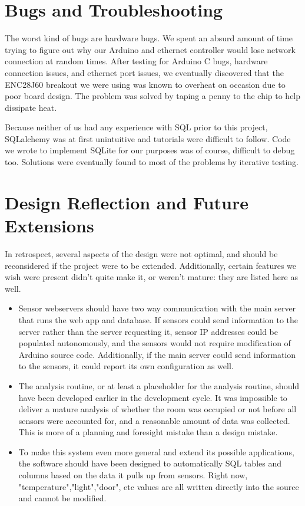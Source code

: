 \documentclass{article}
\begin{document}
\section*{Bugs and Troubleshooting}
\par The worst kind of bugs are hardware bugs. We spent an absurd amount of time trying to figure out why our Arduino and ethernet controller would lose network connection at random times. After testing for Arduino C bugs, hardware connection issues, and ethernet port issues, we eventually discovered that the ENC28J60 breakout we were using was known to overheat on occasion due to poor board design. The problem was solved by taping a penny to the chip to help dissipate heat. 

\par Because neither of us had any experience with SQL prior to this project, SQLalchemy was at first unintuitive and tutorials were difficult to follow. Code we wrote to implement SQLite for our purposes was of course, difficult to debug too. Solutions were eventually found to most of the problems by iterative testing.

\section*{Design Reflection and Future Extensions}
\par In retrospect, several aspects of the design were not optimal, and should be reconsidered if the project were to be extended.  Additionally, certain features we wish were present didn't quite make it, or weren't mature: they are listed here as well.
\begin{itemize}
    \item Sensor webservers should have two way communication with the main server that runs the web app and database. If sensors could send information to the server rather than the server requesting it, sensor IP addresses could be populated autonomously, and the sensors would not require modification of Arduino source code. Additionally, if the main server could send information to the sensors, it could report its own configuration as well.
    \item The analysis routine, or at least a placeholder for the analysis routine, should have been developed earlier in the development cycle. It was impossible to deliver a mature analysis of whether the room was occupied or not before all sensors were accounted for, and a reasonable amount of data was collected. This is more of a planning and foresight mistake than a design mistake.
    \item To make this system even more general and extend its possible applications, the software should have been designed to automatically SQL tables and columns based on the data it pulls up from sensors.  Right now, "temperature","light","door", etc values are all written directly into the source and cannot be modified.
\end{itemize}
\end{document}
